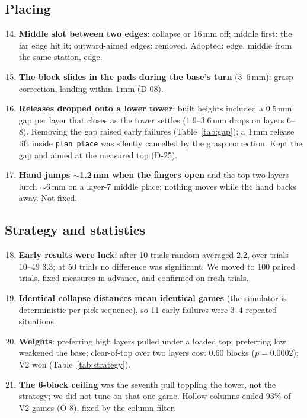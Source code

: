 \documentclass[conference]{IEEEtran}
\begin{document}
\subsection*{Placing}
\begin{enumerate}\setcounter{enumi}{13}
\item \textbf{Middle slot between two edges}: collapse or 16\,mm off; middle first: the far edge hit it; outward-aimed
edges: removed. Adopted: edge, middle from the same station, edge.
\item \textbf{The block slides in the pads during the base's turn} (3--6\,mm): grasp correction, landing within 1\,mm (D-08).
\item \textbf{Releases dropped onto a lower tower}: built heights included a 0.5\,mm gap per layer that closes as the
tower settles (1.9--3.6\,mm drops on layers 6--8). Removing the gap raised early failures (Table~\ref{tab:gap}); a 1\,mm
release lift inside \texttt{plan\_place} was silently cancelled by the grasp correction. Kept the gap and aimed at the
measured top (D-25).
\item \textbf{Hand jumps $\sim$1.2\,mm when the fingers open} and the top two layers lurch $\sim$6\,mm on a layer-7 middle
place; nothing moves while the hand backs away. Not fixed.
\end{enumerate}
\subsection*{Strategy and statistics}
\begin{enumerate}\setcounter{enumi}{17}
\item \textbf{Early results were luck}: after 10 trials random averaged 2.2, over trials 10--49 3.3; at 50 trials no
difference was significant. We moved to 100 paired trials, fixed measures in advance, and confirmed on fresh trials.
\item \textbf{Identical collapse distances mean identical games} (the simulator is deterministic per pick sequence), so
11 early failures were 3--4 repeated situations.
\item \textbf{Weights}: preferring high layers pulled under a loaded top; preferring low weakened the base; clear-of-top
over two layers cost 0.60 blocks ($p=0.0002$); V2 won (Table~\ref{tab:strategy}).
\item \textbf{The 6-block ceiling} was the seventh pull toppling the tower, not the strategy; we did not tune on that one
game. Hollow columns ended 93\% of V2 games (O-8), fixed by the column filter.
\end{enumerate}
\end{document}
